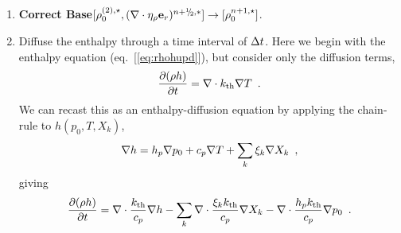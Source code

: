 \begin{description}
\begin{enumerate}
\begin{enumerate}
\begin{description}
\end{description}

  \end{enumerate}

\item {\bf Correct Base}$[\rho_0^{(2),\star}, (\nabla\cdot\etarho\er)^{\nph,*}] \rightarrow [\rho_0^{n+1,\star}]$.



\item Diffuse the enthalpy through a time interval of $\Delta t$.  Here we begin
with the enthalpy equation (eq.~[\ref{eq:rhohupd}]), but consider only the 
diffusion terms,
\begin{equation}
  \frac{\partial (\rho h)}{\partial t}  = 
 \nabla\cdot k_{\rm th}\nabla T 
\enskip . \label{eq:rhohupdthermal} 
  \end{equation}
We can recast this as an enthalpy-diffusion equation by applying the
chain-rule to $h(p_0,T,X_k)$,
\begin{equation}
\nabla h = h_p \nabla p_0 + c_p \nabla T + \sum_k \xi_k \nabla X_k \enskip ,
\end{equation}
giving
\begin{equation}
  \frac{\partial (\rho h)}{\partial t}  = 
 \nabla\cdot \frac{k_{\rm th}}{c_p}\nabla h -  
 \sum_k \nabla\cdot \frac{\xi_k k_{\rm th}}{c_p}\nabla X_k -
 \nabla\cdot \frac{h_p k_{\rm th}}{c_p}\nabla p_0 
\enskip . \label{eq:rhohupdthermal2} 
  \end{equation}



\end{enumerate}
\end{description}
